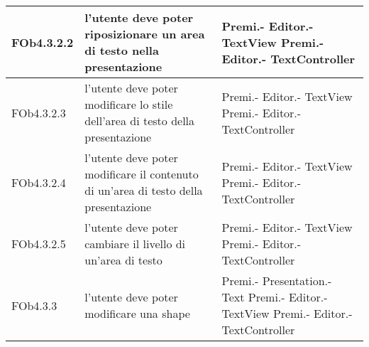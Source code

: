 \begin{longtable}{|l|p{5cm}|p{7cm}|}
\hline
FOb4.3.2.2 & l'utente deve poter riposizionare un area di testo nella presentazione & Premi.- \linebreak Editor.- \linebreak TextView \linebreak Premi.- \linebreak Editor.- \linebreak TextController \linebreak \\
\hline
FOb4.3.2.3 & l'utente deve poter modificare lo stile dell'area di testo della presentazione & Premi.- \linebreak Editor.- \linebreak TextView \linebreak Premi.- \linebreak Editor.- \linebreak TextController \linebreak \\
\hline
FOb4.3.2.4 & l'utente deve poter modificare il contenuto di un'area di testo della presentazione & Premi.- \linebreak Editor.- \linebreak TextView \linebreak Premi.- \linebreak Editor.- \linebreak TextController \linebreak \\
\hline
FOb4.3.2.5 & l'utente deve poter cambiare il livello di un'area di testo & Premi.- \linebreak Editor.- \linebreak TextView \linebreak Premi.- \linebreak Editor.- \linebreak TextController \linebreak \\
\hline
FOb4.3.3 & l'utente deve poter modificare una shape & Premi.- \linebreak Presentation.- \linebreak Text \linebreak Premi.- \linebreak Editor.- \linebreak TextView \linebreak Premi.- \linebreak Editor.- \linebreak TextController \linebreak \\

\end{longtable}
